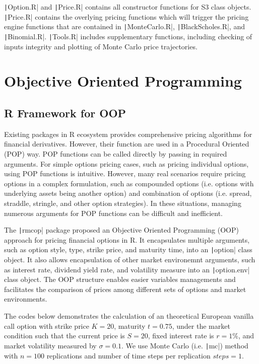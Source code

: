 \texttt|Option.R| and \texttt|Price.R| contains all constructor functions for S3 class objects. \texttt|Price.R| contains the overlying pricing functions which will trigger the pricing engine functions that are contained in \texttt|MonteCarlo.R|, \texttt|BlackScholes.R|, and \texttt|Binomial.R|. \texttt|Tools.R| includes supplementary functions, including checking of inputs integrity and plotting of Monte Carlo price trajectories.

\section{Objective Oriented Programming}

\subsection{R Framework for OOP}

Existing packages in R ecosystem provides comprehensive pricing algorithms for financial derivatives. However, their function are used in a Procedural Oriented (POP) way. POP functions can be called directly by passing in required arguments. For simple options pricing cases, such as pricing individual options, using POP functions is intuitive. However, many real scenarios require pricing options in a complex formulation, such as compounded options (i.e. options with underlying assets being another option) and combination of options (i.e. spread, straddle, stringle, and other option strategies). In these situations, managing numerous arguments for POP functions can be difficult and inefficient.

The \texttt|rmcop| package proposed an Objective Oriented Programming (OOP) approach for pricing financial options in R. It encapsulates multiple arguments, such as option style, type, strike price, and maturity time, into an \texttt|option| class object. It also allows encapsulation of other market environemnt arguments, such as interest rate, dividend yield rate, and volatility measure into an \texttt|option.env| class object. The OOP structure enables easier variables managements and facilitates the comparison of prices among different sets of options and market environments.

The codes below demonstrates the calculation of an theoretical European vanilla call option with strike price $K = 20$, maturity $t = 0.75$, under the market condition such that the current price is $S = 20$, fixed interest rate is $r = 1\%$, and market volatility measured by $\sigma = 0.1$. We use Monte Carlo (i.e. \texttt|mc|) method with $n = 100$ replications and number of time steps per replication $steps = 1$.

